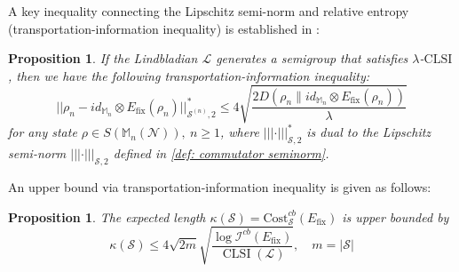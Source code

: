 \documentclass[11pt,reqno]{amsart}
\numberwithin{equation}{section}
\newtheorem{prop}[lemma]{Proposition}
\DeclareMathOperator{\CLSI}{\text{CLSI}}
\newcommand{\mb}{\mathbb}
\newcommand{\mc}{\mathcal}
\newcommand{\Cost}{\mathrm{Cost}}
\newcommand{\fix}{\mathrm{fix}}
\newcommand{\pl}{\hspace{.1cm}}
\begin{document}

A key inequality connecting the Lipschitz semi-norm and relative entropy (transportation-information inequality) is established in \cite[Corollary 6.8]{Fisher}:
\begin{prop}\label{proposition:TA}
		If the Lindbladian $\mc L$ generates a semigroup that satisfies $\lambda$-$\mathrm{CLSI}$, then we have the following transportation-information inequality:
		\begin{equation}
			||\rho_n - id_{\mb M_n} \otimes E_\fix(\rho_n)||_{\mc S^{(n)},2}^* \leq 4\sqrt{\frac{2D(\rho_n \| id_{\mb M_n} \otimes E_\fix(\rho_n))}{\lambda}}
		\end{equation} 
		for any state $\rho \in S(\mb M_n(\mc N)),\ n\ge 1$, where $|||\cdot|||_{\mc S,2}^*$ is dual to the Lipschitz semi-norm $|||\cdot|||_{\mc S,2}$ defined in \eqref{def: commutator seminorm}.
\end{prop}
An upper bound via transportation-information inequality is given as follows:
\begin{prop}\label{prop:expected length upper bound}
		The expected length $\kappa(\mc S) = \Cost_{\mc S}^{cb}(E_\fix)$ is upper bounded by 
		\begin{equation}
			 \kappa(\mc S) \le 4\sqrt{2m} \sqrt{\frac{\log \mc I^{cb}(E_\fix)}{\CLSI(\mc L)}},\quad m = |\mc S|
	\end{equation}
\end{prop}	
\end{document}
